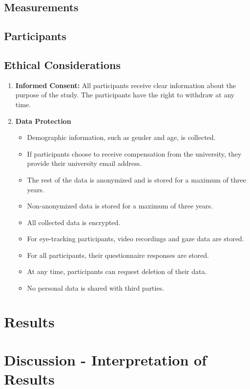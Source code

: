 \section{Measurements}

\section{Participants}


\section{Ethical Considerations}

\begin{enumerate}
    \item \textbf{Informed Consent: }All participants receive clear information about the purpose of the study. The participants have the right to withdraw at any time.
    
    \item \textbf{Data Protection}
    \begin{itemize}
        \item Demographic information, such as gender and age, is collected.
        \item If participants choose to receive compensation from the university, they provide their university email address.
        \item The rest of the data is anonymized and is stored for a maximum of three years.
        \item Non-anonymized data is stored for a maximum of three years.
        \item All collected data is encrypted.
        \item For eye-tracking participants, video recordings and gaze data are stored.
        \item For all participants, their questionnaire responses are stored.
        \item At any time, participants can request deletion of their data.
        \item No personal data is shared with third parties.
    \end{itemize}
\end{enumerate}

\chapter{Results}

\chapter{Discussion - Interpretation of Results}

